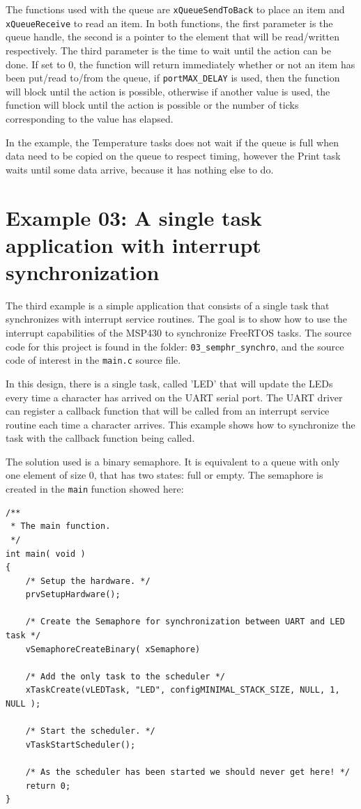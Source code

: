 \documentclass[11pt]{report}
\begin{document}
The functions used with the queue are \verb$xQueueSendToBack$ to place an item and \verb$xQueueReceive$ to read an item. In both functions, the first parameter is the queue handle, the second is a pointer to the element that will be read/written respectively. The third parameter is the time to wait until the action can be done. If set to 0, the function will return immediately whether or not an item has been put/read to/from the queue, if \verb$portMAX_DELAY$ is used, then the function will block until the action is possible, otherwise if another value is used, the function will block until the action is possible or the number of ticks corresponding to the value has elapsed.

In the example, the Temperature tasks does not wait if the queue is full when data need to be copied on the queue to respect timing, however the Print task waits until some data arrive, because it has nothing else to do.

\section{Example 03: A single task application with interrupt synchronization}

The third example is a simple application that consists of a single task that synchronizes with interrupt service routines. The goal is to show how to use the interrupt capabilities of the MSP430 to synchronize FreeRTOS tasks. The source code for this project is found in the folder: \verb$03_semphr_synchro$, and the source code of interest in the \verb$main.c$ source file.

In this design, there is a single task, called 'LED' that will update the LEDs every time a character has arrived on the UART serial port. The UART driver can register a callback function that will be called from an interrupt service routine each time a character arrives. This example shows how to synchronize the task with the callback function being called.

The solution used is a binary semaphore. It is equivalent to a queue with only one element of size 0, that has two states: full or empty. The semaphore is created in the \verb$main$ function showed here:
\begin{verbatim}
/**
 * The main function.
 */
int main( void )
{
    /* Setup the hardware. */
    prvSetupHardware();
    
    /* Create the Semaphore for synchronization between UART and LED task */
    vSemaphoreCreateBinary( xSemaphore)
    
    /* Add the only task to the scheduler */
    xTaskCreate(vLEDTask, "LED", configMINIMAL_STACK_SIZE, NULL, 1, NULL );
    
    /* Start the scheduler. */
    vTaskStartScheduler();
    
    /* As the scheduler has been started we should never get here! */
    return 0;
}
\end{verbatim}
\end{document}
